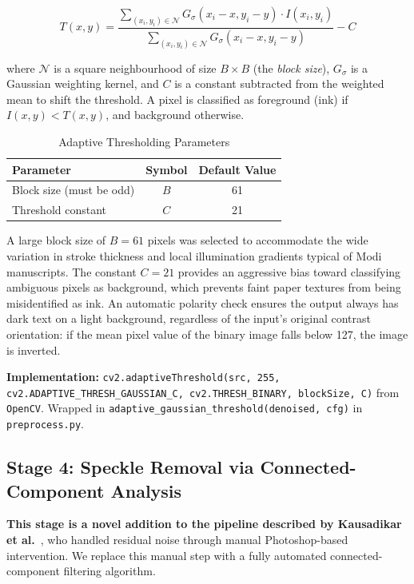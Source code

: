 \documentclass[12pt, a4paper]{article}
\begin{document}
\begin{equation}
    T(x,y) = \frac{\sum_{(x_i,y_i) \in \mathcal{N}} G_{\sigma}(x_i - x, y_i - y) \cdot I(x_i, y_i)}{\sum_{(x_i,y_i) \in \mathcal{N}} G_{\sigma}(x_i - x, y_i - y)} - C
    \label{eq:adaptive_thresh}
\end{equation}

where $\mathcal{N}$ is a square neighbourhood of size $B \times B$ (the \emph{block size}), $G_\sigma$ is a Gaussian weighting kernel, and $C$ is a constant subtracted from the weighted mean to shift the threshold. A pixel is classified as foreground (ink) if $I(x,y) < T(x,y)$, and background otherwise.

\begin{table}[H]
\centering
\caption{Adaptive Thresholding Parameters}
\label{tab:thresh_params}
\begin{tabular}{@{}lcc@{}}
\toprule
\textbf{Parameter} & \textbf{Symbol} & \textbf{Default Value} \\
\midrule
Block size (must be odd) & $B$ & 61 \\
Threshold constant & $C$ & 21 \\
\bottomrule
\end{tabular}
\end{table}

A large block size of $B = 61$ pixels was selected to accommodate the wide variation in stroke thickness and local illumination gradients typical of Modi manuscripts. The constant $C = 21$ provides an aggressive bias toward classifying ambiguous pixels as background, which prevents faint paper textures from being misidentified as ink. An automatic polarity check ensures the output always has dark text on a light background, regardless of the input's original contrast orientation: if the mean pixel value of the binary image falls below 127, the image is inverted.

\textbf{Implementation:} \texttt{cv2.adaptiveThreshold(src, 255, cv2.ADAPTIVE\_THRESH\_GAUSSIAN\_C, cv2.THRESH\_BINARY, blockSize, C)} from \texttt{OpenCV}. Wrapped in \texttt{adaptive\_gaussian\_threshold(denoised, cfg)} in \texttt{preprocess.py}.


\subsection{Stage 4: Speckle Removal via Connected-Component Analysis}
\label{sec:speckle}

\textbf{This stage is a novel addition to the pipeline described by Kausadikar et al.}~\cite{kausadikar2025}, who handled residual noise through manual Photoshop-based intervention. We replace this manual step with a fully automated connected-component filtering algorithm.
\end{document}
